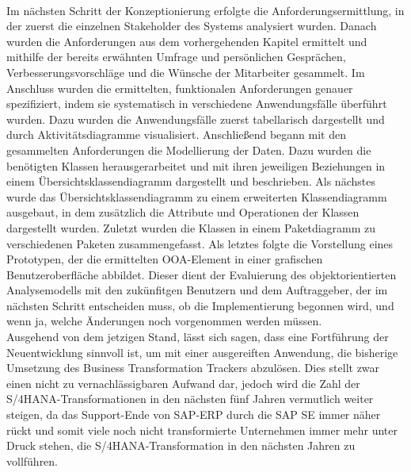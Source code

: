 \\Im nächsten Schritt der Konzeptionierung erfolgte die Anforderungsermittlung, in der zuerst die einzelnen Stakeholder des Systems analysiert wurden. Danach wurden die Anforderungen aus dem vorhergehenden Kapitel ermittelt und mithilfe der bereits erwähnten Umfrage und persönlichen Gesprächen, Verbesserungsvorschläge und die Wünsche der Mitarbeiter gesammelt. Im Anschluss wurden die ermittelten, funktionalen Anforderungen genauer spezifiziert, indem sie systematisch in verschiedene Anwendungsfälle überführt wurden. Dazu wurden die Anwendungsfälle zuerst tabellarisch dargestellt und durch Aktivitätsdiagramme visualisiert. Anschließend begann mit den gesammelten Anforderungen die Modellierung der Daten. Dazu wurden die benötigten Klassen herausgerarbeitet und mit ihren jeweiligen Beziehungen in einem Übersichtsklassendiagramm dargestellt und beschrieben. Als nächstes wurde das Übersichtsklassendiagramm zu einem erweiterten Klassendiagramm ausgebaut, in dem zusätzlich die Attribute und Operationen der Klassen dargestellt wurden. Zuletzt wurden die Klassen in einem Paketdiagramm zu verschiedenen Paketen zusammengefasst.
Als letztes folgte die Vorstellung eines Prototypen, der die ermittelten OOA-Element in einer grafischen Benutzeroberfläche abbildet. Dieser dient der Evaluierung des objektorientierten Analysemodells mit den zukünfitgen Benutzern und dem Auftraggeber, der im nächsten Schritt entscheiden muss, ob die Implementierung begonnen wird, und wenn ja, welche Änderungen noch vorgenommen werden müssen.\\
Ausgehend von dem jetzigen Stand, lässt sich sagen, dass eine Fortführung der Neuentwicklung sinnvoll ist, um mit einer ausgereiften Anwendung, die bisherige Umsetzung des Business Transformation Trackers abzulösen. Dies stellt zwar einen nicht zu vernachlässigbaren Aufwand dar, jedoch wird die Zahl der S/4HANA-Transformationen in den nächsten fünf Jahren vermutlich weiter steigen, da das Support-Ende von SAP-ERP durch die SAP SE immer näher rückt und somit viele noch nicht transformierte Unternehmen immer mehr unter Druck stehen, die S/4HANA-Transformation in den nächsten Jahren zu vollführen.